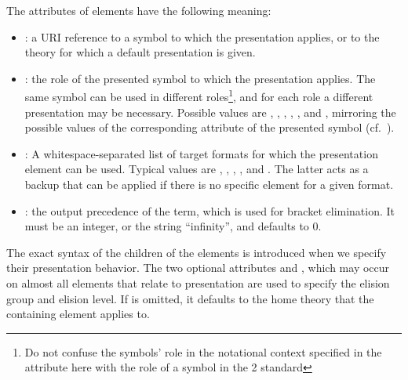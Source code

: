 The attributes of {} elements have the following meaning:
\begin{itemize}
\item {}: a URI reference to a symbol to which the
  presentation applies, or to the theory for which a default presentation is given.
\item {}: the role of the presented symbol to which the
  presentation applies. The same symbol can be used in different roles\footnote{Do not
    confuse the symbols' role in the notational context specified in the
    {} attribute here with the role of a symbol in the
    {\openmath}2 standard}, and for each role a different presentation may be necessary.
  Possible values are {},
  {}, {},
  {}, {}, and
  {}, mirroring the possible values of the corresponding
  attribute of the presented symbol (cf.~\cite[chapter~15.2.1]{Kohlhase:omdoc1.2}).
\item {}: A whitespace-separated list of target formats
  for which the presentation element can be used. Typical values are
  {}, {},
  {}, {}, and
  {}. The latter acts as a backup that can be applied
  if there is no specific {} element for a given format.
\item {}: the output precedence of the term, which is
  used for bracket elimination. It must be an integer, or the string ``infinity'', and
  defaults to $0$.\ednote{IMHO reicht $[0,\infty)$; $(-\infty,+\infty)$ braucht man nicht.
    --CL}
\end{itemize} 
The exact syntax of the children of the {} elements is introduced
when we specify their presentation behavior. The two optional attributes
{} and {}, which may occur on almost all
elements that relate to presentation are used to specify the elision group and elision
level. If {} is omitted, it defaults to the home theory that the
containing {} element applies to.

